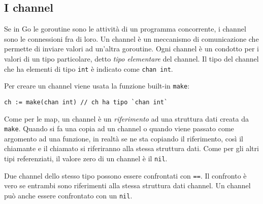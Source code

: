 \documentclass[../../thesis.tex]{subfiles}
\begin{document}
    \subsection{I channel}\label{subsec:i-channel}
    Se in Go le goroutine sono le attività di un programma concorrente, i channel sono le connessioni fra di loro.
    Un channel è un meccanismo di comunicazione che permette di inviare valori ad un'altra goroutine.
    Ogni channel è un condotto per i valori di un tipo particolare, detto \textit{tipo elementare} del channel.
    Il tipo del channel che ha elementi di tipo \verb"int" è indicato come \verb"chan int".
    \hfill \vspace{12pt}

    Per creare un channel viene usata la funzione built-in \verb"make":
    \begin{lstlisting}[frame = single, label = {lst:lstlisting7-4.1}]
ch := make(chan int) // ch ha tipo `chan int`
    \end{lstlisting}
    Come per le map, un channel è un \textit{riferimento} ad una struttura dati creata da \verb"make".
    Quando si fa una copia ad un channel o quando viene passato come argomento ad una funzione, in realtà se ne sta copiando il riferimento, così il chiamante e il chiamato si riferiranno alla stessa struttura dati.
    Come per gli altri tipi referenziati, il valore zero di un channel è il \verb"nil".
    \hfill \vspace{12pt}

    Due channel dello stesso tipo possono essere confrontati con \verb"==".
    Il confronto è vero se entrambi sono riferimenti alla stessa struttura dati channel.
    Un channel può anche essere confrontato con un \verb"nil".
    \hfill \vspace{12pt}
\end{document}
